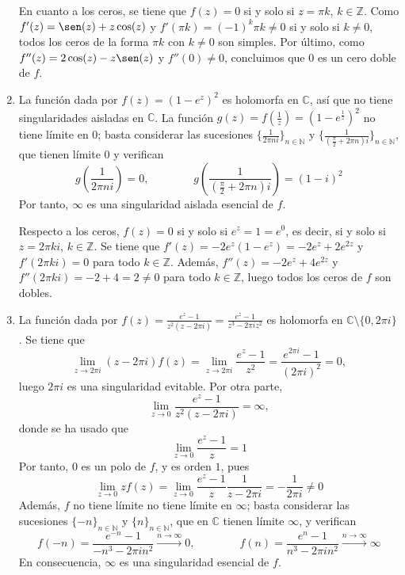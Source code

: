 \documentclass[11pt]{report}
\makeatletter
\renewenvironment{proof}[1][\proofname]{\par
  \pushQED{\qed}%
  \normalfont \topsep\z@skip %
  \trivlist
  \item[\hskip\labelsep
        \itshape
    #1\@addpunct{.}]\ignorespaces
}{%
  \popQED\endtrivlist\@endpefalse
}
\newcommand{\N}{\mathbb N}
\newcommand{\Z}{\mathbb Z}
\newcommand{\C}{\mathbb C}
\makeatother
\begin{document}
\begin{proof}
\begin{enumerate}
    En cuanto a los ceros, se tiene que $f(z)=0$ si y solo si $z = \pi k$, $k \in \Z$. Como $f'(z)=\sen(z)+z\cos(z)$ y $f'(\pi k) = (-1)^k \pi k \neq 0$ si y solo si $k \neq 0$, todos los ceros de la forma $\pi k$ con $k \neq 0$ son simples. Por último, como $f''(z)=2\cos(z)-z\sen(z)$ y $f''(0) \neq 0$, concluimos que $0$ es un cero doble de $f$.
    \item La función dada por $f(z)=(1-e^z)^2$ es holomorfa en $\C$, así que no tiene singularidades aisladas en $\C$. La función $g(z)=f(\frac{1}{z}) = (1-e^{\frac{1}{z}})^2$ no tiene límite en $0$; basta considerar las sucesiones $\{\frac{1}{2\pi ni}\}_{n \in \N}$ y $\{\frac{1}{(\frac{\pi}{2}+2\pi n)i}\}_{n \in \N}$, que tienen límite $0$ y verifican
    \[g\left(\frac{1}{2\pi ni}\right)=0, \qquad \qquad g\left(\frac{1}{(\frac{\pi}{2}+2\pi n)i}\right) = (1-i)^2\]
    Por tanto, $\infty$ es una singularidad aislada esencial de $f$.

    Respecto a los ceros, $f(z) = 0$ si y solo si $e^z = 1 = e^0$, es decir, si y solo si $z = 2\pi k i$, $k \in \Z$. Se tiene que $f'(z)=-2e^z(1-e^z) = -2e^z+2e^{2z}$ y $f'(2\pi k i) = 0$ para todo $k \in \Z$. Además, $f''(z) = -2e^z+4e^{2z}$ y $f''(2\pi k i) = -2+4=2 \neq 0$ para todo $k \in \Z$, luego todos los ceros de $f$ son dobles.
    \item La función dada por $f(z)=\frac{e^z-1}{z^2(z-2\pi i)} = \frac{e^z-1}{z^3-2\pi i z^2}$ es holomorfa en $\C \setminus \{0,2\pi i\}$. Se tiene que
    \[\lim_{z \to 2\pi i}(z-2\pi i)f(z)=\lim_{z \to 2 \pi i} \frac{e^z-1}{z^2} = \frac{e^{2\pi i}-1}{(2\pi i)^2} = 0,\]
    luego $2\pi i$ es una singularidad evitable. Por otra parte,
    \[\lim_{z \to 0} \frac{e^z-1}{z^2(z-2\pi i)} = \infty,\]
    donde se ha usado que 
    \[\lim_{z \to 0} \frac{e^z-1}{z} = 1\]
    Por tanto, $0$ es un polo de $f$, y es orden $1$, pues
    \[\lim_{z \to 0}zf(z)=\lim_{z \to 0} \frac{e^z-1}{z}\frac{1}{z-2\pi i} = -\frac{1}{2\pi i} \neq 0\]
    Además, $f$ no tiene límite no tiene límite en $\infty$; basta considerar las sucesiones $\{-n\}_{n \in \N}$ y $\{n\}_{n \in \N}$, que en $\C$ tienen límite $\infty$, y verifican
    \[f(-n) = \frac{e^{-n}-1}{-n^3-2\pi i n^2} \xrightarrow[]{n \to \infty}0, \qquad \qquad f(n)=\frac{e^n-1}{n^3-2\pi i n^2} \xrightarrow[]{n \to \infty} \infty\]
    En consecuencia, $\infty$ es una singularidad esencial de $f$. 
    

\end{enumerate}
\end{proof}
\end{document}
